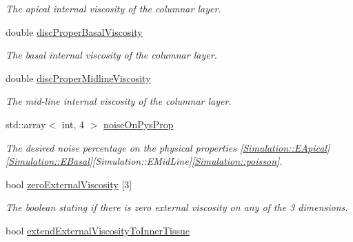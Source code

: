 \begin{DoxyCompactItemize}
\begin{DoxyCompactList}\small\item\em The apical internal viscosity of the columnar layer. \end{DoxyCompactList}\item 
\hypertarget{classSimulation_a3332b7870109dcfcf57bdd36566844e9}{}double \hyperlink{classSimulation_a3332b7870109dcfcf57bdd36566844e9}{disc\+Proper\+Basal\+Viscosity}\label{classSimulation_a3332b7870109dcfcf57bdd36566844e9}

\begin{DoxyCompactList}\small\item\em The basal internal viscosity of the columnar layer. \end{DoxyCompactList}\item 
\hypertarget{classSimulation_a5940ac39f46fd4f07d6cde8bb403fb80}{}double \hyperlink{classSimulation_a5940ac39f46fd4f07d6cde8bb403fb80}{disc\+Proper\+Midline\+Viscosity}\label{classSimulation_a5940ac39f46fd4f07d6cde8bb403fb80}

\begin{DoxyCompactList}\small\item\em The mid-\/line internal viscosity of the columnar layer. \end{DoxyCompactList}\item 
\hypertarget{classSimulation_a762d730b0722e46ac8cec52816477249}{}std\+::array$<$ int, 4 $>$ \hyperlink{classSimulation_a762d730b0722e46ac8cec52816477249}{noise\+On\+Pys\+Prop}\label{classSimulation_a762d730b0722e46ac8cec52816477249}

\begin{DoxyCompactList}\small\item\em The desired noise percentage on the physical properties \mbox{[}\hyperlink{classSimulation_a624c8f135227f36c3749fb12b89f6937}{Simulation\+::\+E\+Apical}\mbox{]} \mbox{[}\hyperlink{classSimulation_ac36c6cc857bb7cdb84ccf9c17ef5bcba}{Simulation\+::\+E\+Basal}\mbox{]}\mbox{[}Simulation\+::\+E\+Mid\+Line\mbox{]}\mbox{[}\hyperlink{classSimulation_a49bdb9254f7b7f5a6e33352c43881422}{Simulation\+::poisson}\mbox{]}. \end{DoxyCompactList}\item 
\hypertarget{classSimulation_a865d265405d3d496d3755735ff72484b}{}bool \hyperlink{classSimulation_a865d265405d3d496d3755735ff72484b}{zero\+External\+Viscosity} \mbox{[}3\mbox{]}\label{classSimulation_a865d265405d3d496d3755735ff72484b}

\begin{DoxyCompactList}\small\item\em The boolean stating if there is zero external viscosity on any of the 3 dimensions. \end{DoxyCompactList}\item 
\hypertarget{classSimulation_a850dff7ea7bb0fe75dd0e2cac62d9eba}{}bool \hyperlink{classSimulation_a850dff7ea7bb0fe75dd0e2cac62d9eba}{extend\+External\+Viscosity\+To\+Inner\+Tissue}\label{classSimulation_a850dff7ea7bb0fe75dd0e2cac62d9eba}


\end{DoxyCompactItemize}
